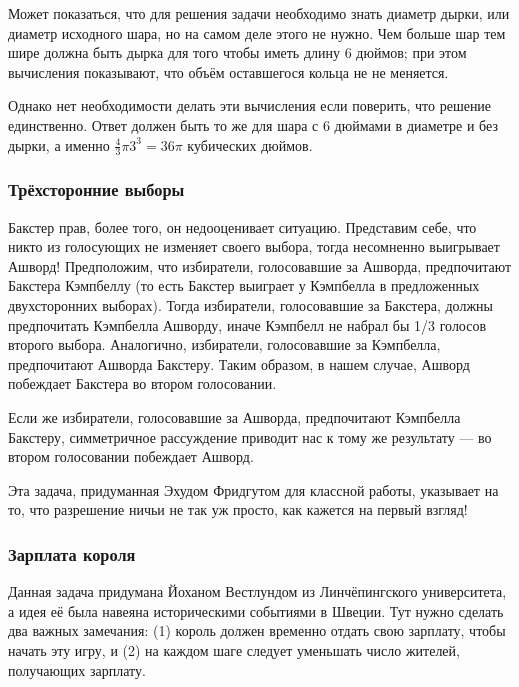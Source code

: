Может показаться, что для решения задачи необходимо знать диаметр дырки, или диаметр исходного шара, но на самом деле этого не нужно.
Чем больше шар тем шире должна быть дырка для того чтобы иметь длину 6 дюймов;
при этом вычисления показывают, что объём оставшегося кольца не не меняется.

Однако нет необходимости делать эти вычисления если поверить, что решение единственно.
Ответ должен быть то же для шара с 6 дюймами в диаметре и без дырки, а именно $\tfrac43\pi3^3=36\pi$ кубических дюймов.

\subsubsection*{Трёхсторонние выборы}%

Бакстер прав, более того, он недооценивает ситуацию.
Представим себе, что никто из голосующих не изменяет своего выбора, тогда несомненно выигрывает Ашворд!
Предположим, что избиратели, голосовавшие за Ашворда, предпочитают Бакстера Кэмпбеллу (то есть Бакстер выиграет у Кэмпбелла в предложенных двухсторонних выборах).
Тогда избиратели, голосовавшие за Бакстера, должны предпочитать
Кэмпбелла Ашворду, иначе Кэмпбелл не набрал бы 1/3 голосов второго выбора.
Аналогично, избиратели, голосовавшие за Кэмпбелла, предпочитают Ашворда
Бакстеру.
Таким образом, в нашем случае, Ашворд побеждает Бакстера во втором
голосовании.

Если же избиратели, голосовавшие за Ашворда, предпочитают Кэмпбелла Бакстеру, симметричное рассуждение приводит нас к тому же результату --- во втором голосовании побеждает Ашворд.
\heart

Эта задача, придуманная Эхудом Фридгутом %
для классной работы, указывает на то, что разрешение ничьи не так уж просто, как кажется на первый взгляд!%

\subsubsection*{Зарплата короля}%

Данная задача придумана Йоханом Вестлундом %
из Линчёпингского университета, а идея её была навеяна историческими событиями в Швеции.
Тут нужно сделать два важных замечания: (1) король должен временно отдать свою зарплату, чтобы начать эту игру, и (2) на каждом шаге следует уменьшать число жителей, получающих зарплату.

